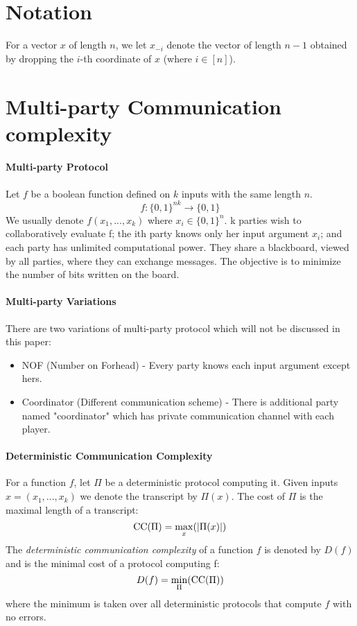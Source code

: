 \section{Notation}
For a vector $x$ of length $n$, we let $x_{-i}$ denote the vector of length $n-1$ obtained by dropping the $i$-th coordinate of $x$ (where $i \in [n]$).

\section{Multi-party Communication complexity}
\paragraph{Multi-party Protocol}
Let $f$ be a boolean function defined on $k$ inputs with the same length $n$.
\begin{equation*}
    f: \{0, 1\}^{nk} \rightarrow \{0, 1\}
\end{equation*}
We usually denote $f(x_1, ... , x_k)$ where $x_i \in \{0, 1\}^{n}$. \newline
k parties wish to collaboratively evaluate f; the ith party knows only her input argument $x_i$; and each party has unlimited computational power. They share a blackboard, viewed by all parties, where they can exchange messages. The objective is to minimize the number of bits written on the board. 

\paragraph{Multi-party Variations}
There are two variations of multi-party protocol which will not be discussed in this paper:
\begin{itemize}
    \item NOF (Number on Forhead) - Every party knows each input argument except hers.
    \item Coordinator (Different communication scheme) - There is additional party named "coordinator" which has private communication channel with each player. 
\end{itemize}

\paragraph{Deterministic Communication Complexity}
For a function $f$, let $\Pi$ be a deterministic protocol
computing it. Given inputs $x = (x_1, . . . , x_k)$ we denote the transcript by $\Pi(x)$. The cost of
$\Pi$ is the maximal length of a transcript:
\begin{equation*}
    \mathrm{CC}(\Pi) = \max_x(|\Pi(x)|)    
\end{equation*}
The \emph{deterministic communication complexity} of a function $f$ is denoted by $D(f)$ and is the minimal cost of a protocol
computing f:
\begin{equation*}
    D(f) = \min_\Pi(\mathrm{CC}(\Pi))
\end{equation*}
where the minimum is taken over all deterministic protocols that compute $f$ with no errors.

